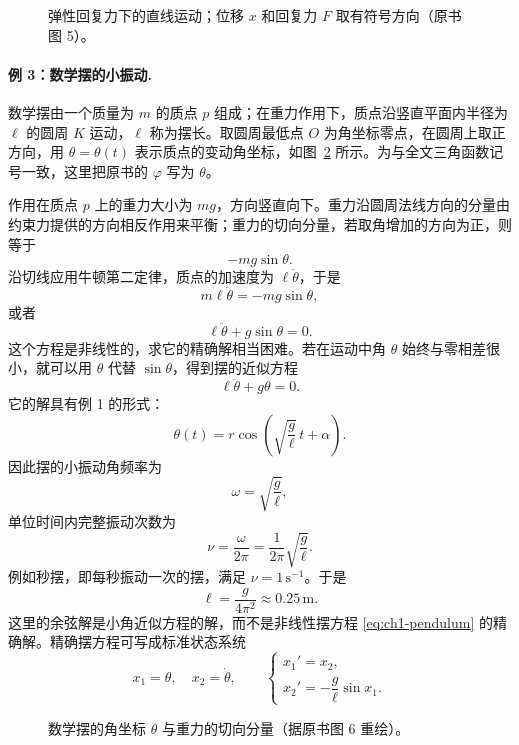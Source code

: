 \begin{figure}[H]
 \centering
 \resizebox{0.78\textwidth}{!}{}
 \caption{弹性回复力下的直线运动；位移 \(x\) 和回复力 \(F\) 取有符号方向（原书图 5）。}
 \label{fig:ch1-spring}
\end{figure}

\paragraph{例 3：数学摆的小振动.}
数学摆由一个质量为 \(m\) 的质点 \(p\) 组成；在重力作用下，质点沿竖直平面内半径为 \(\ell\) 的圆周 \(K\) 运动，\(\ell\) 称为摆长。取圆周最低点 \(O\) 为角坐标零点，在圆周上取正方向，用 \(\theta=\theta(t)\) 表示质点的变动角坐标，如图~\ref{fig:ch1-pendulum} 所示。为与全文三角函数记号一致，这里把原书的 \(\varphi\) 写为 \(\theta\)。

作用在质点 \(p\) 上的重力大小为 \(mg\)，方向竖直向下。重力沿圆周法线方向的分量由约束力提供的方向相反作用来平衡；重力的切向分量，若取角增加的方向为正，则等于
\[
 -mg\sin\theta.
\]
沿切线应用牛顿第二定律，质点的加速度为 \(\ell\ddot\theta\)，于是
\[
 m\ell\ddot\theta=-mg\sin\theta,
\]
或者
\begin{equation}
 \ell\ddot\theta+g\sin\theta=0.
 \label{eq:ch1-pendulum}
\end{equation}
这个方程是非线性的，求它的精确解相当困难。若在运动中角 \(\theta\) 始终与零相差很小，就可以用 \(\theta\) 代替 \(\sin\theta\)，得到摆的近似方程
\begin{equation}
 \ell\ddot\theta+g\theta=0.
 \label{eq:ch1-pendulum-linearized}
\end{equation}
它的解具有例 1 的形式：
\begin{equation}
 \theta(t)=r\cos\left(\sqrt{\frac{g}{\ell}}\,t+\alpha\right).
 \label{eq:ch1-pendulum-small-solution}
\end{equation}
因此摆的小振动角频率为
\[
 \omega=\sqrt{\frac{g}{\ell}},
\]
单位时间内完整振动次数为
\[
 \nu=\frac{\omega}{2\pi}
 =\frac{1}{2\pi}\sqrt{\frac{g}{\ell}}.
\]
例如秒摆，即每秒振动一次的摆，满足 \(\nu=1\,\mathrm{s}^{-1}\)。于是
\[
 \ell=\frac{g}{4\pi^2}\approx 0.25\,\mathrm m.
\]
这里的余弦解是小角近似方程的解，而不是非线性摆方程 \eqref{eq:ch1-pendulum} 的精确解。精确摆方程可写成标准状态系统
\[
 x_1=\theta,\quad x_2=\dot\theta,
 \qquad
 \begin{cases}
  x_1'=x_2,\\
  x_2'=-\dfrac{g}{\ell}\sin x_1.
 \end{cases}
\]

\begin{figure}[H]
 \centering
 \resizebox{0.58\textwidth}{!}{}
 \caption{数学摆的角坐标 $\theta$ 与重力的切向分量（据原书图 6 重绘）。}
 \label{fig:ch1-pendulum}
\end{figure}

